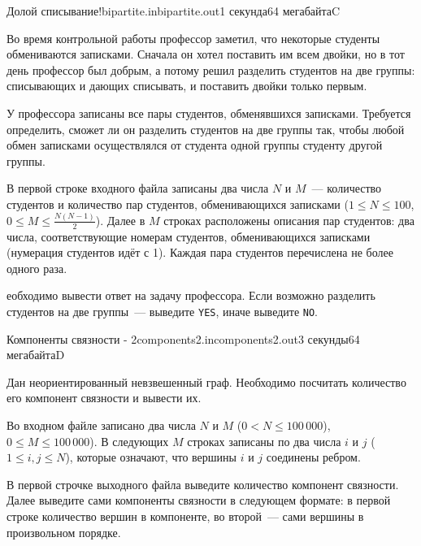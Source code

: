 \documentclass[12pt,a4paper,oneside,twocolumn,landscape]{article}
\renewcommand{\le}{\leqslant}
\begin{document}
\bigskip\bigskip
\begin{problem}{Долой списывание!}{bipartite.in}{bipartite.out}{1 секунда}{64 мегабайта}{C}

Во время контрольной работы профессор заметил,
что некоторые студенты обмениваются записками.
Сначала он хотел поставить им всем двойки,
но в тот день профессор был добрым,
а потому решил разделить студентов на две группы:
списывающих и дающих списывать, и поставить двойки только первым.

У профессора записаны все пары студентов, обменявшихся записками.
Требуется определить, сможет ли он разделить студентов на две группы так,
чтобы любой обмен записками осуществлялся от студента одной группы
студенту другой группы.

\InputFile
В первой строке входного файла записаны два числа $N$ и $M$~---
количество студентов и количество пар студентов, обменивающихся записками
($1\le N\le 100$, $0\le M\le \frac{N(N-1)}{2}$).
Далее в $M$ строках расположены описания пар студентов:
два числа, соответствующие номерам студентов, обменивающихся записками
(нумерация студентов идёт с 1). Каждая пара студентов перечислена
не более одного раза.

\OutputFile
еобходимо вывести ответ на задачу профессора.
Если возможно разделить студентов на две группы~--- выведите \verb"YES",
иначе выведите \verb"NO".

\Examples

\begin{example}
%
%
\end{example}


\end{problem}

\bigskip\bigskip
\begin{problem}{Компоненты связности - 2}{components2.in}{components2.out}{3 секунды}{64 мегабайта}{D}



Дан неориентированный невзвешенный граф. Необходимо посчитать количество его компонент связности и вывести их.

\InputFile
Во входном файле записано два числа $N$ и $M$ ($0 < N \leqslant 100\,000$), $0 \leqslant M \leqslant 100\,000$). В следующих $M$ строках записаны по два числа $i$ и $j$ 
($1 \leqslant i,j \leqslant N$), которые означают, что вершины $i$ и $j$ соединены ребром.

\OutputFile
В первой строчке выходного файла выведите количество компонент связности. 
Далее выведите сами компоненты связности в следующем формате: в первой строке количество вершин в компоненте, во второй~--- сами вершины в произвольном порядке.


\Example

\begin{example}
%
\end{example}


\end{problem}
\end{document}
